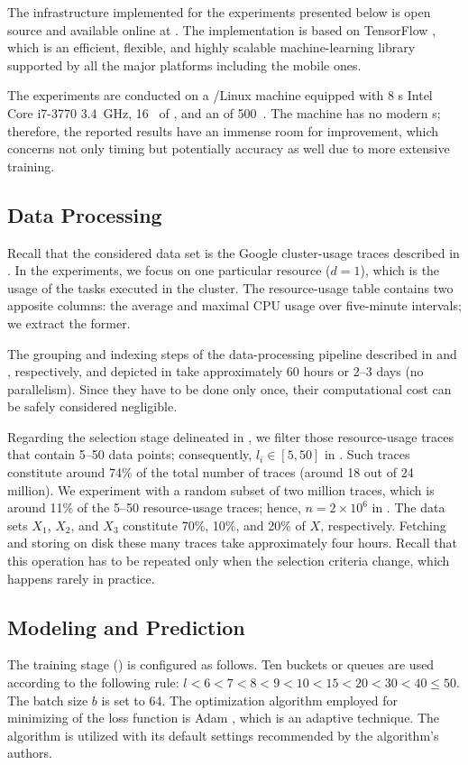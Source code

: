 The infrastructure implemented for the experiments presented below is open
source and available online at \cite{sources}. The implementation is based on
TensorFlow \cite{abadi2015}, which is an efficient, flexible, and highly
scalable machine-learning library supported by all the major platforms including
the mobile ones.

The experiments are conducted on a /Linux machine equipped with 8
s Intel Core i7-3770 3.4~GHz, 16~ of , and an  of
500~. The machine has no modern s; therefore, the reported
results have an immense room for improvement, which concerns not only timing but
potentially accuracy as well due to more extensive training.

\subsection{Data Processing}
Recall that the considered data set is the Google cluster-usage traces
\cite{reiss2011} described in . In the experiments, we focus on one
particular resource ($d = 1$), which is the  usage of the tasks executed
in the cluster. The resource-usage table contains two apposite columns: the
average and maximal CPU usage over five-minute intervals; we extract the former.

The grouping and indexing steps of the data-processing pipeline described in
 and , respectively, and depicted in
 take approximately 60 hours or 2--3 days (no parallelism). Since
they have to be done only once, their computational cost can be safely
considered negligible.

Regarding the selection stage delineated in , we filter those
resource-usage traces that contain 5--50 data points; consequently, $l_i \in [5,
50]$ in . Such traces constitute around 74\% of the total number of
traces (around 18 out of 24 million). We experiment with a random subset of two
million traces, which is around 11\% of the 5--50 resource-usage traces; hence,
$n = 2 \times 10^6$ in . The data sets $X_1$, $X_2$, and $X_3$
constitute 70\%, 10\%, and 20\% of $X$, respectively. Fetching and storing on
disk these many traces take approximately four hours. Recall that this operation
has to be repeated only when the selection criteria change, which happens rarely
in practice.

\subsection{Modeling and Prediction}
The training stage () is configured as follows. Ten buckets or
queues are used according to the following rule: $l < 6 < 7 < 8 < 9 < 10 < 15 <
20 < 30 < 40 \leq 50$. The batch size $b$ is set to 64. The optimization
algorithm employed for minimizing of the loss function is Adam
\cite{kingma2014}, which is an adaptive technique. The algorithm is utilized
with its default settings recommended by the algorithm's authors.

